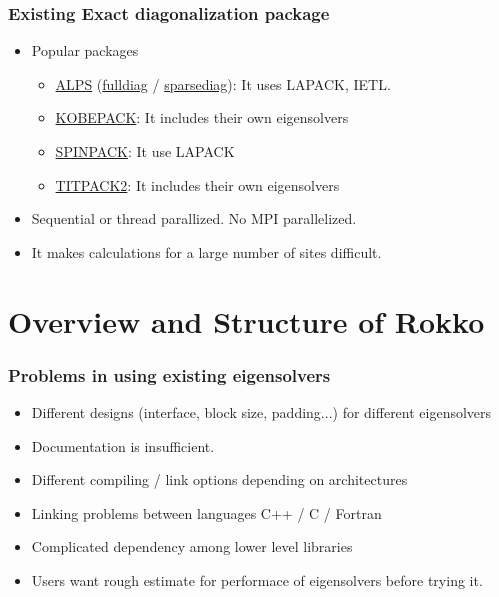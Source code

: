 \begin{frame}
  \frametitle{Existing Exact diagonalization package}
  \begin{itemize}
    \setlength{\itemsep}{1em}
  \item Popular packages
    \begin{itemize}
    \item \href{http://alps.comp-phys.org/mediawiki/index.php/Main_Page}{ALPS} (\href{http://alps.comp-phys.org/static/software/applications/diag/fulldiag/doc/}{fulldiag} / \href{http://alps.comp-phys.org/mediawiki/index.php/Documentation:sparsediag}{sparsediag}): It uses LAPACK, IETL.
    \item \href{http://quattro.phys.sci.kobe-u.ac.jp/Kobe_Pack/Kobe_Pack.html}{KOBEPACK}: It includes their own eigensolvers
    \item \href{http://www-e.uni-magdeburg.de/jschulen/spin/}{SPINPACK}: It use LAPACK
    \item \href{http://www.noc.titech.ac.jp/~phys0016_nishimori/titpack2_new/index-e.html}{TITPACK2}: It includes their own eigensolvers
    \end{itemize}
  \item Sequential or thread parallized. No MPI parallelized.
  \item It makes calculations for a large number of sites difficult.
  \end{itemize}
\end{frame}

\section{Overview and Structure of Rokko}

\begin{frame}
  \frametitle{Problems in using existing eigensolvers}
  \begin{itemize}
    \setlength{\itemsep}{1em}
  \item Different designs (interface, block size, padding...) for different eigensolvers
  \item Documentation is insufficient.
  \item Different compiling / link options depending on architectures
  \item Linking problems between languages C++ / C / Fortran
  \item Complicated dependency among lower level libraries
  \item Users want rough estimate for performace of eigensolvers before trying it.
  \end{itemize}
\end{frame}

